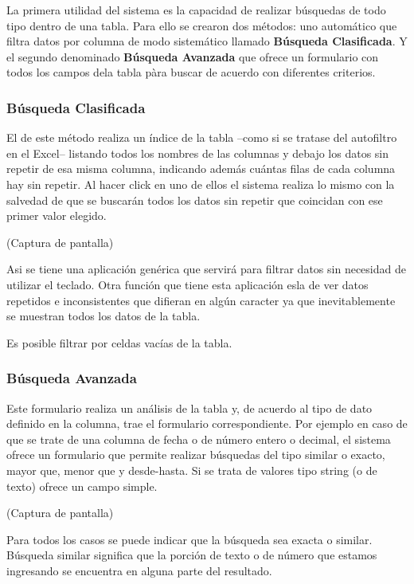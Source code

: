 \documentclass[a4paper,10pt]{article}
\begin{document}
La primera utilidad del sistema es la capacidad de realizar búsquedas de todo tipo dentro de una tabla. 
Para ello se crearon dos métodos: uno automático que filtra datos por columna de modo sistemático llamado \textbf{Búsqueda Clasificada}. Y el segundo denominado \textbf{Búsqueda Avanzada} que ofrece un formulario con todos los campos dela tabla pàra buscar de acuerdo con diferentes criterios.

\subsubsection{Búsqueda Clasificada}

El de este método realiza un índice de la tabla --como si se tratase del autofiltro en el Excel-- listando todos los nombres de las columnas y debajo los datos sin repetir de esa misma columna, indicando además cuántas filas de cada columna hay sin repetir. Al hacer click en uno de ellos el sistema realiza lo mismo con la salvedad de que se buscarán todos los datos sin repetir que coincidan con ese primer valor elegido.

(Captura de pantalla)

Asi se tiene una aplicación genérica que servirá para filtrar datos sin necesidad de utilizar el teclado. Otra función que tiene esta aplicación esla de ver datos repetidos e inconsistentes que difieran en algún caracter ya que inevitablemente se muestran todos los datos de la tabla.

Es posible filtrar por celdas vacías de la tabla. 


\subsubsection{Búsqueda Avanzada}

Este formulario realiza un análisis de la tabla y, de acuerdo al tipo de dato definido en la columna, trae el formulario correspondiente. Por ejemplo en caso de que se trate de una columna de fecha o de número entero o decimal, el sistema ofrece un formulario que permite realizar búsquedas del tipo similar o exacto, mayor que, menor que y desde-hasta. Si se trata de valores tipo string (o de texto) ofrece un campo simple.

(Captura de pantalla)

Para todos los casos se puede indicar que la búsqueda sea exacta o similar. Búsqueda similar significa que la porción de texto o de número que estamos ingresando se encuentra en alguna parte del resultado.
\end{document}
